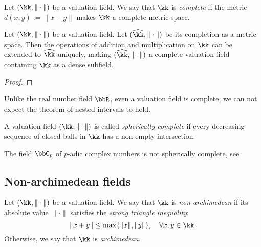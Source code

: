     \begin{definition}\label{def:complete_valuation_field}
        Let \((\kk,\|\cdot\|)\) be a valuation field.
        We say that \(\kk\) is \emph{complete} if the metric \(d(x,y) := \|x - y\|\) makes \(\kk\) a complete metric space.
    \end{definition}

    \begin{lemma}\label{lem:completion_of_valuation_field}
        Let \((\kk,\|\cdot\|)\) be a valuation field.
        Let \((\widehat{\kk},\|\cdot\|)\) be its completion as a metric space.
        Then the operations of addition and multiplication on \(\kk\) can be extended to \(\widehat{\kk}\) uniquely, making \((\widehat{\kk},\|\cdot\|)\) a complete valuation field containing \(\kk\) as a dense subfield.
    \end{lemma}
    \begin{proof}
    \end{proof}

    Unlike the real number field \(\bbR\), even a valuation field is complete, we can not expect the theorem of nested intervals to hold.

    \begin{definition}\label{def:spherically_complete}
        A valuation field \((\kk,\|\cdot\|)\) is called \emph{spherically complete} if every decreasing sequence of closed balls in \(\kk\) has a non-empty intersection.
    \end{definition}

    \begin{example}\label{eg:p-adic_complex_field_is_not_spherically_complete}
        The field \(\bbC_p\) of \(p\)-adic complex numbers is not spherically complete, see 
    \end{example}

\subsection{Non-archimedean fields}

    \begin{definition}\label{def:non-archimedean_fields}
        Let \((\kk,\|\cdot\|)\) be a valuation field.
        We say that \(\kk\) is \emph{non-archimedean} if its absolute value \(\|\cdot\|\) satisfies the \emph{strong triangle inequality}:
        \[ \|x+y\|\leq\max\{\|x\|,\|y\|\},\quad\forall x,y\in\kk. \]
        Otherwise, we say that \(\kk\) is \emph{archimedean}.
    \end{definition}

